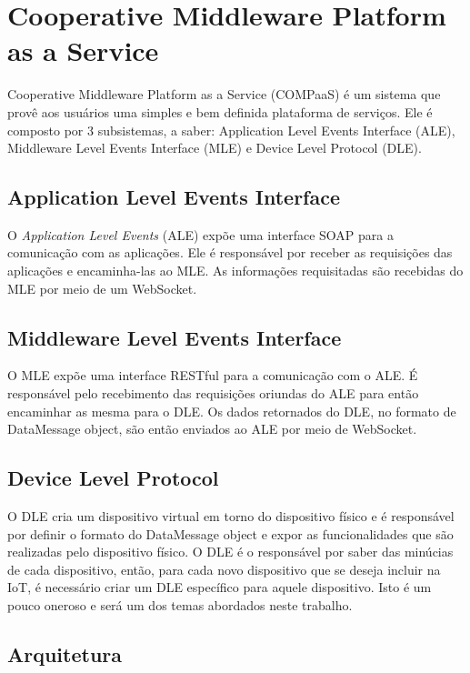 \section{Cooperative Middleware Platform as a Service}
\label{sec:COMPaaS}
Cooperative Middleware Platform as a Service (COMPaaS) é um sistema que provê aos usuários uma simples e bem
definida plataforma de serviços. Ele é composto por 3 subsistemas, a saber:  Application Level Events
Interface (ALE), Middleware Level Events Interface (MLE) e Device Level Protocol (DLE).

\subsection{Application Level Events Interface}
O \textit{Application Level Events} (ALE) expõe uma interface SOAP para a comunicação com as aplicações.
Ele é responsável por receber as requisições das aplicações e encaminha-las ao MLE. As informações
requisitadas são recebidas do MLE por meio de um WebSocket.

\subsection{Middleware Level Events Interface}
O MLE expõe uma interface RESTful para a comunicação com o ALE. É responsável pelo recebimento das requisições
oriundas do ALE para então encaminhar as mesma para o DLE. Os dados retornados do DLE, no formato de DataMessage
object, são então enviados ao ALE por meio de WebSocket.

\subsection{Device Level Protocol}
O DLE cria um dispositivo virtual em torno do dispositivo físico e é responsável por definir o formato do DataMessage
object e expor as funcionalidades que são realizadas pelo dispositivo físico. O DLE é o responsável por saber das
minúcias de cada dispositivo, então, para cada novo dispositivo que se deseja incluir na IoT, é necessário criar
um DLE específico para aquele dispositivo. Isto é um pouco oneroso e será um dos temas abordados neste trabalho.

\subsection{Arquitetura}
